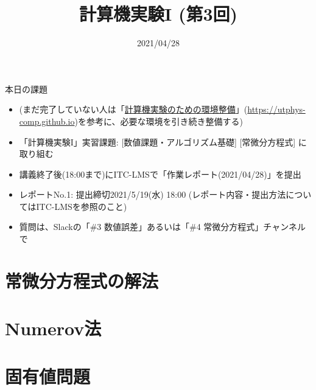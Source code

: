 \documentclass[10pt,dvipdfmx]{beamer}
\title{計算機実験I (第3回)}
\date{2021/04/28}
\begin{document}
\begin{frame}
  \titlepage
  \tableofcontents
\end{frame}

\begin{frame}[t]{本日の課題}
  \begin{itemize}
  \item (まだ完了していない人は「\href{https://utphys-comp.github.io}{計算機実験のための環境整備}」({\small \href{https://utphys-comp.github.io}{https://utphys-comp.github.io}})を参考に、必要な環境を引き続き整備する)
    
  \item 「計算機実験I」実習課題: [数値課題・アルゴリズム基礎] [常微分方程式] に取り組む
  \item 講義終了後(18:00まで)にITC-LMSで「作業レポート(2021/04/28)」を提出
  \item レポートNo.1: 提出締切2021/5/19(水) 18:00 (レポート内容・提出方法についてはITC-LMSを参照のこと)
  \item 質問は、Slackの「\#3 数値誤差」あるいは「\#4 常微分方程式」チャンネルで
  \end{itemize}
\end{frame}

\section{常微分方程式の解法}





\section{Numerov法}





\section{固有値問題}




\end{document}
